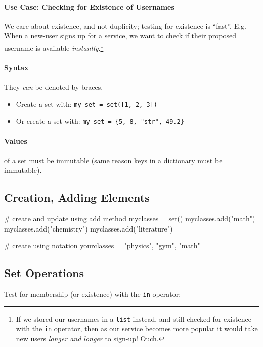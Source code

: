\documentclass[12pt,letterpaper,twoside]{article}
\begin{document}
\paragraph{Use Case: Checking for Existence of Usernames} We care about existence, and not duplicity; testing for existence is ``fast''.
E.g. When a new-user signs up for a service, we want to check if their proposed username is available 
\emph{instantly}.\footnote{If we stored our usernames in a \texttt{list} instead,
and still checked for existence with the \texttt{in} operator, then as our service becomes more popular it would
take new users \emph{longer and longer} to sign-up! Ouch.}

\vspace{-3ex}
\paragraph{Syntax}
They \emph{can} be denoted by braces.

\vspace{-2ex}
\begin{itemize}
\item
  Create a set with: \texttt{my\_set\ =\ set({[}1,\ 2,\ 3{]})}
\item
  Or create a set with: \texttt{my\_set\ =\ \{5,\ 8,\ "str",\ 49.2\}}
\end{itemize}

\paragraph{Values} of a set must be immutable (same reason keys in a
  dictionary must be immutable).

\subsection{Creation, Adding Elements}

\begin{python}
# create and update using add method
myclasses = set()
myclasses.add("math")
myclasses.add("chemistry")
myclasses.add("literature")

# create using {} notation
yourclasses = {"physics", "gym", "math"}
\end{python}

\subsection{Set Operations}
Test for membership (or existence) with the \texttt{in} operator:
\end{document}
